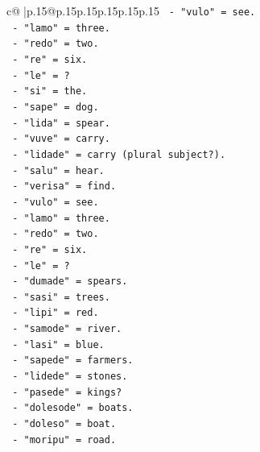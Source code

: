 \documentclass{article}
\begin{document}
{\begin{supertabular}{c@{$\;$}|p{.15\linewidth}@{}p{.15\linewidth}p{.15\linewidth}p{.15\linewidth}p{.15\linewidth}p{.15\linewidth}}
{{{\texttt{                        {-} "vulo" = see.} \\
\texttt{                        {-} "lamo" = three.} \\
\texttt{                        {-} "redo" = two.} \\
\texttt{                        {-} "re" = six.} \\
\texttt{                        {-} "le" = ?} \\
\texttt{                        {-} "si" = the.} \\
\texttt{                        {-} "sape" = dog.} \\
\texttt{                        {-} "lida" = spear.} \\
\texttt{                        {-} "vuve" = carry.} \\
\texttt{                        {-} "lidade" = carry (plural subject?).} \\
\texttt{                        {-} "salu" = hear.} \\
\texttt{                        {-} "verisa" = find.} \\
\texttt{                        {-} "vulo" = see.} \\
\texttt{                        {-} "lamo" = three.} \\
\texttt{                        {-} "redo" = two.} \\
\texttt{                        {-} "re" = six.} \\
\texttt{                        {-} "le" = ?} \\
\texttt{                        {-} "dumade" = spears.} \\
\texttt{                        {-} "sasi" = trees.} \\
\texttt{                        {-} "lipi" = red.} \\
\texttt{                        {-} "samode" = river.} \\
\texttt{                        {-} "lasi" = blue.} \\
\texttt{                        {-} "sapede" = farmers.} \\
\texttt{                        {-} "lidede" = stones.} \\
\texttt{                        {-} "pasede" = kings?} \\
\texttt{                        {-} "dolesode" = boats.} \\
\texttt{                        {-} "doleso" = boat.} \\
\texttt{                        {-} "moripu" = road.} \\
}}}
\end{supertabular}}
\end{document}
